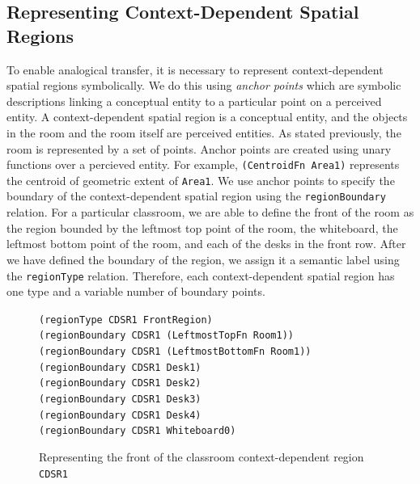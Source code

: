 \documentclass[letterpaper]{article}
\newcommand{\from}[2]{\textcolor{red}{\noindent\textbf{//}\textbf{Note
      from #1:}\textsc{ #2}\textbf{//}}}
\newcommand{\fw}[1]{\texttt{#1}}
\begin{document}
\subsection{Representing Context-Dependent Spatial Regions}

To enable analogical transfer, it is necessary to represent context-dependent spatial regions symbolically. We do this using \textit{anchor points} \cite{Klenk/etal2005} which are symbolic descriptions linking a conceptual entity to a particular point on a perceived entity.  A context-dependent spatial region is a conceptual entity, and the objects in the room and the room itself are perceived entities. As stated previously, the room is represented by a set of points. Anchor points are created using unary functions over a percieved entity. For example, \fw{(CentroidFn Area1)} represents the centroid of geometric extent of \fw{Area1}. We use anchor points to specify the boundary of the context-dependent spatial region using the \fw{regionBoundary} relation. For a particular classroom, we are able to define the front of the room as the region bounded by the leftmost top point of the room, the whiteboard, the leftmost bottom point of the room, and each of the desks in the front row. After we have defined the boundary of the region, we assign it a semantic label using the \fw{regionType} relation. Therefore, each context-dependent spatial region has one type and a variable number of boundary points.

\begin{figure}[h]
	{\fontsize{8}{8} %
  
\fw{(regionType CDSR1 FrontRegion)\\
(regionBoundary CDSR1 (LeftmostTopFn Room1))\\
(regionBoundary CDSR1 (LeftmostBottomFn Room1))\\
(regionBoundary CDSR1 Desk1)\\
(regionBoundary CDSR1 Desk2)\\
(regionBoundary CDSR1 Desk3)\\
(regionBoundary CDSR1 Desk4)\\
(regionBoundary CDSR1 Whiteboard0)\\
}}
  \caption{Representing the front of the classroom context-dependent region \fw{CDSR1}}
  \label{fig:cdsr-reps}
\end{figure}
\end{document}
